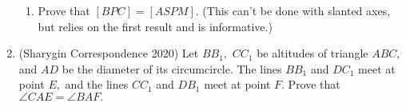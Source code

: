 \documentclass{article}
\begin{document}
\begin{enumerate}
\begin{enumerate}
        \item Prove that $[BPC]=[ASPM].$ (This can't be done with slanted axes, but relies on the first result and is informative.) 
    \end{enumerate}
    
    \item (Sharygin Correspondence 2020) Let $BB_1,$ $CC_1$ be altitudes of triangle $ABC,$ and $AD$ be the diameter of its circumcircle. The lines $BB_1$ and $DC_1$ meet at point $E,$ and the lines $CC_1$ and $DB_1$ meet at point $F.$ Prove that $\angle CAE=\angle BAF.$
\end{enumerate}
\end{document}
